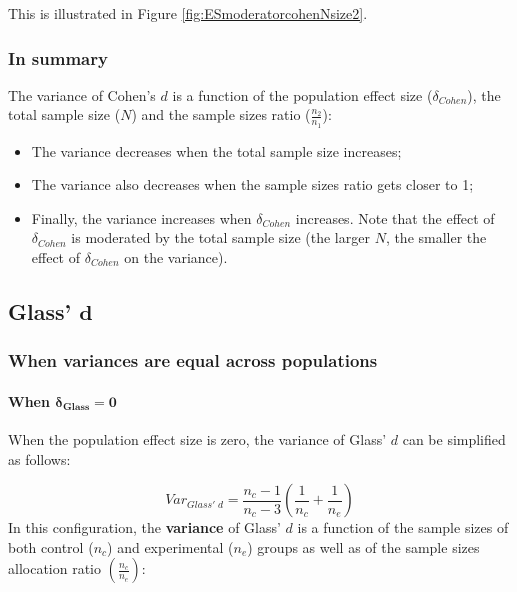 \documentclass[
  english,
  man,mask]{apa6}
\providecommand{\tightlist}{%
  \setlength{\itemsep}{0pt}\setlength{\parskip}{0pt}}
\let\oldparagraph\paragraph
\renewcommand{\paragraph}[1]{\oldparagraph{#1}\mbox{}}
\begin{document}
This is illustrated in Figure \ref{fig:ESmoderatorcohenNsize2}.

\hypertarget{in-summary}{%
\subsubsection{In summary}\label{in-summary}}

The variance of Cohen's \(d\) is a function of the population effect size (\(\delta_{Cohen}\)), the total sample size (\(N\)) and the sample sizes ratio (\(\frac{n_2}{n_1}\)):

\begin{itemize}
\tightlist
\item
  The variance decreases when the total sample size increases;\\
\item
  The variance also decreases when the sample sizes ratio gets closer to 1;\\
\item
  Finally, the variance increases when \(\delta_{Cohen}\) increases. Note that the effect of \(\delta_{Cohen}\) is moderated by the total sample size (the larger \(N\), the smaller the effect of \(\delta_{Cohen}\) on the variance).
\end{itemize}

\hypertarget{glass-bmd}{%
\subsection{\texorpdfstring{Glass' \(\bm{d}\)}{Glass' \textbackslash bm\{d\}}}\label{glass-bmd}}

\hypertarget{when-variances-are-equal-across-populations-1}{%
\subsubsection{When variances are equal across populations}\label{when-variances-are-equal-across-populations-1}}

\hypertarget{when-bmdelta_glass0}{%
\paragraph{\texorpdfstring{When \(\bm{\delta_{Glass}=0}\)}{When \textbackslash bm\{\textbackslash delta\_\{Glass\}=0\}}}\label{when-bmdelta_glass0}}

When the population effect size is zero, the variance of Glass' \(d\) can be simplified as follows:

\[Var_{Glass' \; d} = \frac{n_c-1}{n_c-3} \left( \frac{1}{n_c}+\frac{1}{n_e}\right)\] In this configuration, the \textbf{variance} of Glass' \(d\) is a function of the sample sizes of both control (\(n_c\)) and experimental (\(n_e\)) groups as well as of the sample sizes allocation ratio \(\left( \frac{n_c}{n_e}\right)\):
\end{document}

